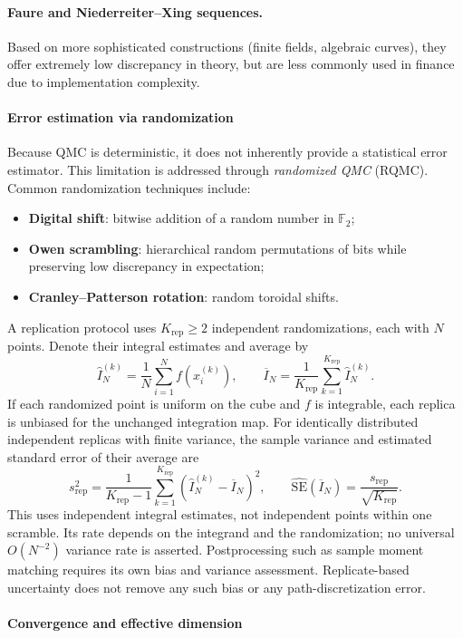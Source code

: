 \paragraph{Faure and Niederreiter--Xing sequences.}
Based on more sophisticated constructions (finite fields, algebraic curves), they offer extremely low discrepancy in theory, but are less commonly used in finance due to implementation complexity.
\paragraph{Error estimation via randomization}

Because QMC is deterministic, it does not inherently provide a statistical error estimator.  
This limitation is addressed through \emph{randomized QMC} (RQMC).  
Common randomization techniques include:
\begin{itemize}
    \item \textbf{Digital shift}: bitwise addition of a random number in $\mathbb{F}_2$;
    \item \textbf{Owen scrambling}: hierarchical random permutations of bits while preserving low discrepancy in expectation;
    \item \textbf{Cranley--Patterson rotation}: random toroidal shifts.
\end{itemize}

A replication protocol uses $K_{\mathrm{rep}}\ge2$ independent randomizations, each with
$N$ points. Denote their integral estimates and average by
\[
\widehat I_N^{(k)}=\frac1N\sum_{i=1}^N f(x_i^{(k)}),\qquad
\overline I_N=\frac1{K_{\mathrm{rep}}}
\sum_{k=1}^{K_{\mathrm{rep}}}\widehat I_N^{(k)}.
\]
If each randomized point is uniform on the cube and $f$ is integrable,
each replica is unbiased for the unchanged integration map. For
identically distributed independent replicas with finite variance,
the sample variance and estimated standard error of their average are
\[
s_{\mathrm{rep}}^2=\frac1{K_{\mathrm{rep}}-1}
\sum_{k=1}^{K_{\mathrm{rep}}}(\widehat I_N^{(k)}-\overline I_N)^2,
\qquad
\widehat{\mathrm{SE}}(\overline I_N)
=\frac{s_{\mathrm{rep}}}{\sqrt{K_{\mathrm{rep}}}}.
\]
This uses independent integral estimates, not independent points
within one scramble. Its rate depends on the integrand and the
randomization; no universal $O(N^{-2})$ variance rate is asserted.
Postprocessing such as sample moment matching requires its own bias
and variance assessment. Replicate-based uncertainty does not remove
any such bias or any path-discretization error.
\paragraph{Convergence and effective dimension}

